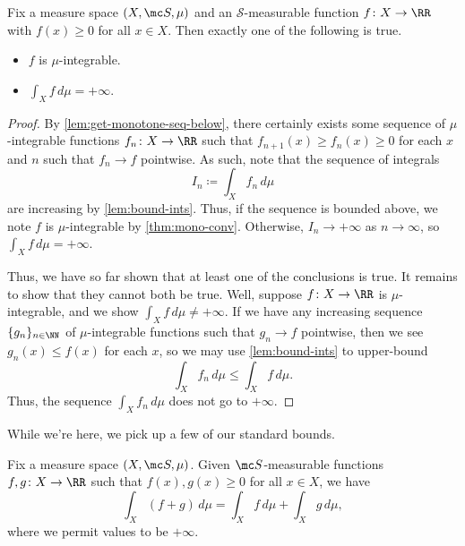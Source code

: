 \documentclass[../notes.tex]{subfiles}
\begin{document}
\begin{proposition} \label{prop:extended-int-makes-sense}
	Fix a measure space $(X,\mc S,\mu)$ and an $\mathcal S$-measurable function $f\colon X\to\RR$ with $f(x)\ge0$ for all $x\in X$. Then exactly one of the following is true.
	\begin{itemize}
		\item $f$ is $\mu$-integrable.
		\item $\int_Xf\,d\mu=+\infty$.
	\end{itemize}
\end{proposition}
\begin{proof}
	By \autoref{lem:get-monotone-seq-below}, there certainly exists some sequence of $\mu$-integrable functions $f_n\colon X\to\RR$ such that $f_{n+1}(x)\ge f_n(x)\ge0$ for each $x$ and $n$ such that $f_n\to f$ pointwise. As such, note that the sequence of integrals
	\[I_n\coloneqq\int_Xf_n\,d\mu\]
	are increasing by \autoref{lem:bound-ints}. Thus, if the sequence is bounded above, we note $f$ is $\mu$-integrable by \autoref{thm:mono-conv}. Otherwise, $I_n\to+\infty$ as $n\to\infty$, so $\int_Xf\,d\mu=+\infty$.

	Thus, we have so far shown that at least one of the conclusions is true. It remains to show that they cannot both be true. Well, suppose $f\colon X\to\RR$ is $\mu$-integrable, and we show $\int_Xf\,d\mu\ne+\infty$. If we have any increasing sequence $\{g_n\}_{n\in\NN}$ of $\mu$-integrable functions such that $g_n\to f$ pointwise, then we see $g_n(x)\le f(x)$ for each $x$, so we may use \autoref{lem:bound-ints} to upper-bound
	\[\int_Xf_n\,d\mu\le\int_Xf\,d\mu.\]
	Thus, the sequence $\int_Xf_n\,d\mu$ does not go to $+\infty$.
\end{proof}
While we're here, we pick up a few of our standard bounds.
\begin{lemma} \label{lem:add-extended-int}
	Fix a measure space $(X,\mc S,\mu)$. Given $\mc S$-measurable functions $f,g\colon X\to\RR$ such that $f(x),g(x)\ge0$ for all $x\in X$, we have
	\[\int_X(f+g)\,d\mu=\int_Xf\,d\mu+\int_Xg\,d\mu,\]
	where we permit values to be $+\infty$.
\end{lemma}
\end{document}
